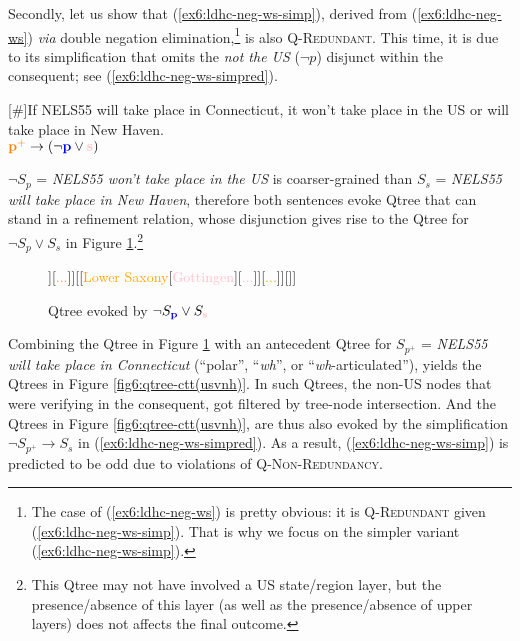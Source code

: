 Secondly, let us show that (\ref{ex6:ldhc-neg-ws-simp}), derived from (\ref{ex6:ldhc-neg-ws}) \textit{via} double negation elimination,\footnote{The case of (\ref{ex6:ldhc-neg-ws}) is pretty obvious: it is \textsc{Q-Redundant} given (\ref{ex6:ldhc-neg-ws-simp}). That is why we focus on the simpler variant (\ref{ex6:ldhc-neg-ws-simp}).} is also \textsc{Q-Redundant}. This time, it is due to its simplification that omits the \textit{not the US} ($\neg p$) disjunct within the consequent; see (\ref{ex6:ldhc-neg-ws-simpred}).

\begin{exe}
	[\#]{If NELS55 will take place in Connecticut, it won't take place in the US or will take place in New Haven.\\
		$\pplus\rightarrow(\neg \p \vee \s)$}
	\label{ex6:ldhc-neg-ws-simpred}
\end{exe}

$\neg S_{p}$ = \textit{NELS55 won't take place in the US} is coarser-grained than $S_{s}$ = \textit{NELS55 will take place in New Haven}, therefore both sentences evoke Qtree that can stand in a refinement relation, whose disjunction gives rise to the Qtree for $\neg S_{p} \vee S_s$ in Figure \ref{fig6:qtree-usvnh}.\footnote{This Qtree may not have involved a US state/region layer, but the presence/absence of this layer (as well as the presence/absence of upper layers) does not affects the final outcome.}

\begin{figure}[H]
	\centering
	\begin{forest}
		[CS[\textcolor{blue}{US}[{\textcolor{orange}{Connecticut}}[\fbox{\textcolor{pink}{New Haven}}][\textcolor{pink}{...}]][\textcolor{orange}{...}]][\fbox{\textcolor{blue}{Germany}}[\textcolor{orange}{Lower Saxony}[{\textcolor{pink}{Gottingen}}][\textcolor{pink}{...}]][\textcolor{orange}{...}]][\fbox{\textcolor{blue}{...}}]]
	\end{forest}
	\caption[]{Qtree evoked by $\neg S_{\p} \vee S_{\s}$}\label{fig6:qtree-usvnh}
\end{figure}

Combining the Qtree in Figure \ref{fig6:qtree-usvnh} with an antecedent Qtree for $S_{p^+}$ = \textit{NELS55 will take place in Connecticut} (``polar'', ``\textit{wh}'', or ``\textit{wh}-articulated''), yields the Qtrees in Figure \ref{fig6:qtree-ctt(usvnh)}. In such Qtrees, the non-US nodes that were verifying in the consequent, got filtered by tree-node intersection. And the Qtrees in Figure \ref{fig6:qtree-ctt(usvnh)}, are thus also evoked by the simplification $\neg S_{p^+} \rightarrow S_s$ in (\ref{ex6:ldhc-neg-ws-simpred}). As a result, (\ref{ex6:ldhc-neg-ws-simp}) is predicted to be odd due to violations of \textsc{Q-Non-Redundancy}.


